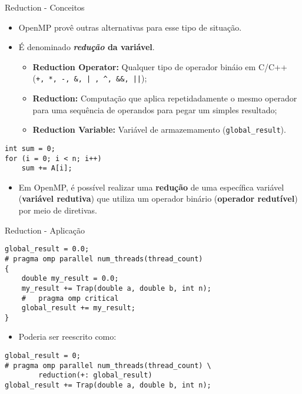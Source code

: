 \begin{frame}[fragile]{Reduction - Conceitos}
	\begin{itemize}
		\item OpenMP provê outras alternativas para esse tipo de situação.
		\item É denominado {\bf \textit{redução} da variável}.
		\begin{itemize}
			\item {\bf Reduction Operator:} Qualquer tipo de operador bináio em C/C++ (\verb!+, *, -, &, | , ^, &&, ||!);
			\item {\bf Reduction:} Computação que aplica repetidadamente o mesmo operador para uma sequência de operandos para pegar um simples resultado;
			\item {\bf Reduction Variable:} Variável de armazemamento (\verb&global_result&).
		\end{itemize}
	\end{itemize}

	\begin{lstlisting}
int sum = 0;
for (i = 0; i < n; i++)
	sum += A[i];
	\end{lstlisting}

	\begin{itemize}
		\item Em OpenMP, é possível realizar uma \textbf{redução} de uma específica variável ({\bf variável redutiva}) que utiliza um operador binário (\textbf{operador redutível}) por meio de diretivas.
	\end{itemize}
\end{frame}




\begin{frame}[fragile]{Reduction - Aplicação}
	\begin{lstlisting}
global_result = 0.0;
# pragma omp parallel num_threads(thread_count)
{
	double my_result = 0.0;
	my_result += Trap(double a, double b, int n); 
	#	pragma omp critical
	global_result += my_result;
}
	\end{lstlisting}

	\begin{itemize}
		\item Poderia ser reescrito como:
	\end{itemize}

	\begin{lstlisting}
global_result = 0;
# pragma omp parallel num_threads(thread_count) \
		reduction(+: global_result)
global_result += Trap(double a, double b, int n);
	\end{lstlisting}
\end{frame}




